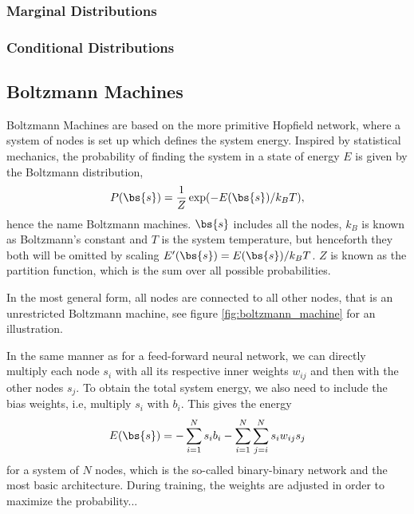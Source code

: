 \subsubsection{Marginal Distributions}

\subsubsection{Conditional Distributions}

\subsection{Boltzmann Machines}
Boltzmann Machines are based on the more primitive Hopfield network, where a system of nodes is set up which defines the system energy. Inspired by statistical mechanics, the probability of finding the system in a state of energy $E$ is given by the Boltzmann distribution,
\begin{equation}
P(\bs{s})=\frac{1}{Z}\exp(-E(\bs{s})/k_BT),
\label{eq:boltzmanndist}
\end{equation}
hence the name Boltzmann machines.  $\bs{s}$ includes all the nodes, $k_B$ is known as Boltzmann's constant and $T$ is the system temperature, but henceforth they both will be omitted by scaling $E'(\bs{s})=E(\bs{s})/k_BT$. $Z$ is known as the partition function, which is the sum over all possible probabilities.

In the most general form, all nodes are connected to all other nodes, that is an unrestricted Boltzmann machine, see figure \eqref{fig:boltzmann_machine} for an illustration. 



In the same manner as for a feed-forward neural network, we can directly multiply each node $s_i$ with all its respective inner weights $w_{ij}$ and then with the other nodes $s_j$. To obtain the total system energy, we also need to include the bias weights, i.e, multiply $s_i$ with $b_i$. This gives the energy
\begin{equation}
E(\bs{s})=- \sum_{i=1}^Ns_ib_i-\sum_{i=1}^N\sum_{j=i}^N s_iw_{ij}s_j 
\label{eq:unrestrictedboltzmannmachine}
\end{equation}
for a system of $N$ nodes, which is the so-called binary-binary network and the most basic architecture. During training, the weights are adjusted in order to maximize the probability...

